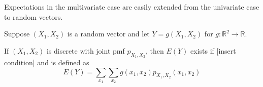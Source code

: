 Expectations in the multivariate case are easily extended from the univariate case to random vectors.

Suppose $(X_1,X_2)$ is a random vector and let $Y=g(X_1,X_2)$ for $g:\mathbb R^2\to\mathbb R$.

If $(X_1,X_2)$ is discrete with joint pmf $p_{X_1,X_2}$, then $E(Y)$ exists if [insert condition] and is defined as $$E(Y)=\sum_{x_1}\sum_{x_2} g(x_1,x_2)p_{X_1,X_2}(x_1,x_2)$$
